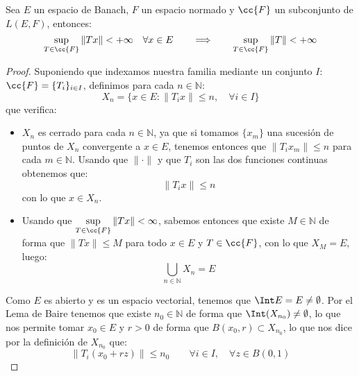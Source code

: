 \begin{teo} %
    Sea $E$ un espacio de Banach, $F$ un espacio normado y $\cc{F}$ un subconjunto de $L(E,F)$, entonces:
    \begin{equation*}
        \sup_{T\in \cc{F}}\|Tx\| < +\infty \quad \forall x\in E \qquad \Longrightarrow \qquad  \sup_{T\in \cc{F}}\|T\| < +\infty
    \end{equation*}
    \begin{proof}
        Suponiendo que indexamos nuestra familia mediante un conjunto $I$: $\cc{F} = \{T_i\}_{i \in I}$, definimos para cada $n\in \mathbb{N}$:
        \begin{equation*}
            X_n = \{x\in E : \|T_i x\| \leq n, \quad \forall i \in I\}
        \end{equation*}
        que verifica:
        \begin{itemize}
            \item $X_n$ es cerrado para cada $n\in \mathbb{N}$, ya que si tomamos $\{x_m\}$ una sucesión de puntos de $X_n$ convergente a $x\in E$, tenemos entonces que $\|T_ix_m\| \leq n$ para cada $m\in \mathbb{N}$. Usando que $\|\cdot \|$ y que $T_i$ son las dos funciones continuas obtenemos que:
                \begin{equation*}
                    \|T_ix\| \leq n
                \end{equation*}
                con lo que $x\in X_n$.
            \item Usando que $\sup\limits_{T\in \cc{F}}\|Tx\| < \infty$, sabemos entonces que existe $M\in \mathbb{N}$ de forma que $\|Tx\| \leq M$ para todo $x\in E$ y $T\in \cc{F}$, con lo que $X_M = E$, luego:
                \begin{equation*}
                    \bigcup_{n\in \mathbb{N}}X_n = E
                \end{equation*}
        \end{itemize}
        Como $E$ es abierto y es un espacio vectorial, tenemos que $\Int E = E \neq \emptyset $. Por el Lema de Baire tenemos que existe $n_0\in \mathbb{N}$ de forma que $\Int(X_{n_0})\neq \emptyset $, lo que nos permite tomar $x_0\in E$ y $r>0$ de forma que $B(x_0,r)\subset X_{n_0}$, lo que nos dice por la definición de $X_{n_0}$ que:
        \begin{equation*}
            \|T_i(x_0 + rz)\| \leq n_0 \qquad \forall i \in I, \quad \forall z\in B(0,1)
        \end{equation*}


\end{proof}
\end{teo}
